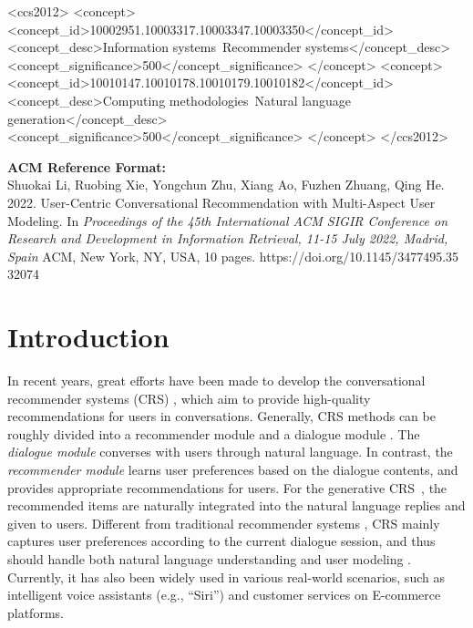 \documentclass[sigconf,natbib=true]{acmart}
\begin{document}
\begin{CCSXML}
<ccs2012>
   <concept>
       <concept_id>10002951.10003317.10003347.10003350</concept_id>
       <concept_desc>Information systems~Recommender systems</concept_desc>
       <concept_significance>500</concept_significance>
       </concept>
   <concept>
       <concept_id>10010147.10010178.10010179.10010182</concept_id>
       <concept_desc>Computing methodologies~Natural language generation</concept_desc>
       <concept_significance>500</concept_significance>
       </concept>
 </ccs2012>
\end{CCSXML}





\maketitle

{
\fontsize{8pt}{8pt} 
\selectfont
\textbf{ACM Reference Format:}
\\
Shuokai Li, Ruobing Xie, Yongchun Zhu, Xiang Ao, Fuzhen Zhuang, Qing He. 2022. User-Centric Conversational Recommendation with Multi-Aspect User Modeling. In  \textit{Proceedings of the 45th International ACM SIGIR Conference on Research and Development in Information Retrieval, 11-15 July 2022, Madrid, Spain} ACM, New York, NY, USA, 10 pages. https://doi.org/10.1145/3477495.35\\32074 }

\section{Introduction}

In recent years, great efforts have been made to develop the conversational recommender systems (CRS) \cite{lesi2020interactive,zhou2020improving,xu2021adapting,fu2021hoops,ren2021learning,xie2021comparison}, which aim to provide high-quality recommendations for users in conversations. Generally, CRS methods can be roughly divided into a recommender module and a dialogue module \cite{chen2019towards,zhou2020improving}. The \emph{dialogue module} converses with users through natural language. In contrast, the \emph{recommender module} learns user preferences based on the dialogue contents, and provides appropriate recommendations for users. For the generative CRS~\cite{zhou2020improving,lu2021revcore}, the recommended items are naturally integrated into the natural language replies and given to users.
Different from traditional recommender systems \cite{cheng2016wide}, CRS mainly captures user preferences according to the current dialogue session, and thus should handle both natural language understanding and user modeling \cite{jannach2020survey}.
Currently, it has also been widely used in various real-world scenarios, such as intelligent voice assistants (e.g., ``Siri'') and customer services on E-commerce platforms.
\end{document}
